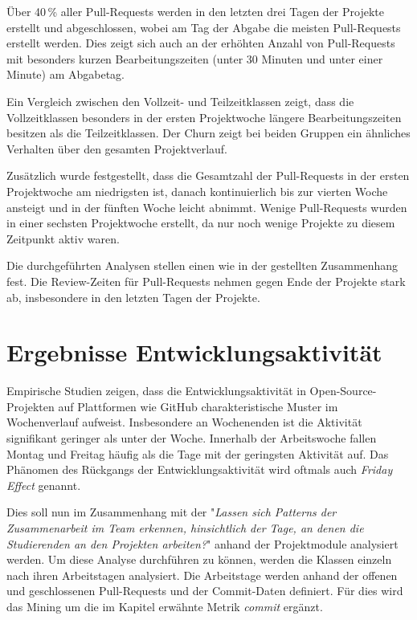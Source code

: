 Über 40\,\% aller Pull-Requests werden in den letzten drei Tagen der Projekte erstellt und abgeschlossen, wobei am Tag der Abgabe die meisten Pull-Requests erstellt werden. Dies zeigt sich auch an der erhöhten Anzahl von Pull-Requests mit besonders kurzen Bearbeitungszeiten (unter 30 Minuten und unter einer Minute) am Abgabetag.

Ein Vergleich zwischen den Vollzeit- und Teilzeitklassen zeigt, dass die Vollzeitklassen besonders in der ersten Projektwoche längere Bearbeitungszeiten besitzen als die Teilzeitklassen. Der Churn zeigt bei beiden Gruppen ein ähnliches Verhalten über den gesamten Projektverlauf.

Zusätzlich wurde festgestellt, dass die Gesamtzahl der Pull-Requests in der ersten Projektwoche am niedrigsten ist, danach kontinuierlich bis zur vierten Woche ansteigt und in der fünften Woche leicht abnimmt. Wenige Pull-Requests wurden in einer sechsten Projektwoche erstellt, da nur noch wenige Projekte zu diesem Zeitpunkt aktiv waren.

Die durchgeführten Analysen stellen einen wie in der  gestellten Zusammenhang fest. Die Review-Zeiten für Pull-Requests nehmen gegen Ende der Projekte stark ab, insbesondere in den letzten Tagen der Projekte.

\newpage
\section{Ergebnisse Entwicklungs\-aktivi\-tät}
\label{sec:ErgebnisseEntwicklungsaktivtät}
Empirische Studien zeigen, dass die Entwicklungsaktivität in Open-Source-Projekten auf Plattformen wie GitHub charakteristische Muster im Wochenverlauf aufweist. Insbesondere an Wochenenden ist die Aktivität signifikant geringer als unter der Woche. Innerhalb der Arbeitswoche fallen Montag und Freitag häufig als die Tage mit der geringsten Aktivität auf. Das Phänomen des Rückgangs der Entwicklungsaktivität wird oftmals auch \textit{Friday Effect} genannt. \parencite{claes_programmers_2018}

Dies soll nun im Zusammenhang mit der  "\textit{Lassen sich Patterns der Zusammenarbeit im Team erkennen,
hinsichtlich der Tage, an denen die Studierenden an den Projekten arbeiten?}" anhand der Projektmodule analysiert werden. Um diese Analyse durchführen zu können, werden die Klassen einzeln nach ihren Arbeitstagen analysiert. Die Arbeitstage werden anhand der offenen und geschlossenen Pull-Requests und der Commit-Daten definiert. Für dies wird das Mining um die im Kapitel  erwähnte Metrik \textit{commit} ergänzt.

